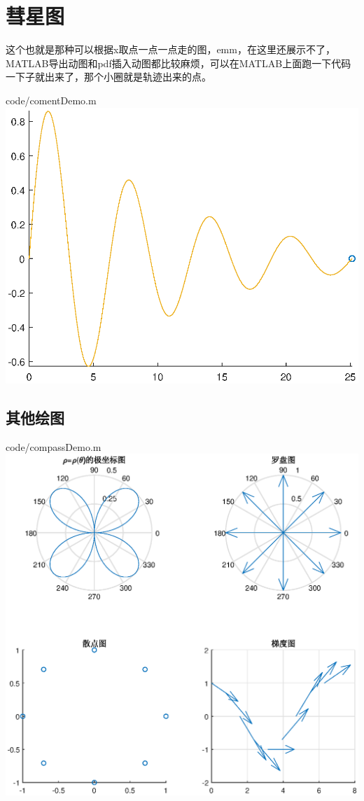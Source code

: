 \documentclass{hfutpaper}
\makeatletter
\newcommand{\figcaption}{\def\@captype{figure}\caption}
\makeatother
\begin{document}
\section*{彗星图}
这个也就是那种可以根据x取点一点一点走的图，emm，在这里还展示不了，MATLAB导出动图和pdf插入动图都比较麻烦，可以在MATLAB上面跑一下代码一下子就出来了，那个小圈就是轨迹出来的点。

{code/comentDemo.m}
\includegraphics{figure/comet.eps}
\figcaption{彗星图(这里是静态的，要在MATLAB里面跑)}
\subsection*{其他绘图}

{code/compassDemo.m}
\includegraphics[width=18cm]{figure/plot3.eps}
\figcaption{(1)极坐标;(2)罗盘图;(3)散点图;(4)梯度图}
\end{document}
